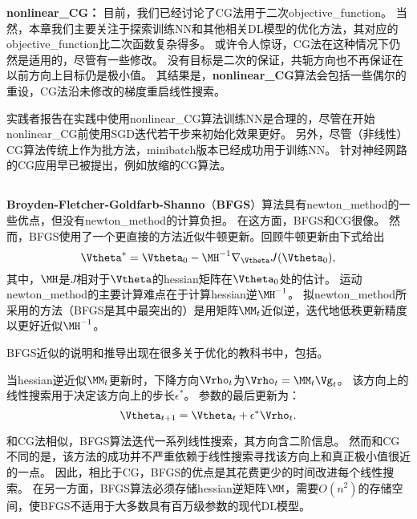 \textbf{\gls{nonlinear_CG}：}
目前，我们已经讨论了\gls{CG}法用于二次\gls{objective_function}。
当然，本章我们主要关注于探索训练\gls{NN}和其他相关\gls{DL}模型的优化方法，其对应的\gls{objective_function}比二次函数复杂得多。
或许令人惊讶，\gls{CG}法在这种情况下仍然是适用的，尽管有一些修改。
没有目标是二次的保证，共轭方向也不再保证在以前方向上目标仍是极小值。
其结果是，\textbf{\gls{nonlinear_CG}}算法会包括一些偶尔的重设，\gls{CG}法沿未修改的梯度重启线性搜索。


实践者报告在实践中使用\gls{nonlinear_CG}算法训练\gls{NN}是合理的，尽管在开始\gls{nonlinear_CG}前使用\gls{SGD}迭代若干步来初始化效果更好。
另外，尽管（非线性）\gls{CG}算法传统上作为批方法，\gls{minibatch}版本已经成功用于训练\gls{NN}\citep{LeRoux-chapter-2011}。
针对神经网路的\gls{CG}应用早已被提出，例如放缩的\gls{CG}算法\citep{Moller}。

\subsection{}
\label{sec:bfgs}
\textbf{Broyden-Fletcher-Goldfarb-Shanno}（\textbf{\gls{BFGS}}）算法具有\gls{newton_method}的一些优点，但没有\gls{newton_method}的计算负担。
在这方面，\gls{BFGS}和CG很像。
然而，\gls{BFGS}使用了一个更直接的方法近似牛顿更新。回顾牛顿更新由下式给出
\begin{equation}
    \Vtheta^* = \Vtheta_0 - \MH^{-1} \nabla_{\Vtheta} J(\Vtheta_0),
\end{equation}
其中，$\MH$是$J$相对于$\Vtheta$的\gls{hessian}矩阵在$\Vtheta_0$处的估计。
运动\gls{newton_method}的主要计算难点在于计算\gls{hessian}逆$\MH^{-1}$。
拟\gls{newton_method}所采用的方法（\gls{BFGS}是其中最突出的）是用矩阵$\MM_t$近似逆，迭代地低秩更新精度以更好近似$\MH^{-1}$。


\gls{BFGS}近似的说明和推导出现在很多关于优化的教科书中，包括\cite{Lue84}。

当\gls{hessian}逆近似$\MM_t$更新时，下降方向$\Vrho_t$为$\Vrho_t = \MM_t \Vg_t$。
该方向上的线性搜索用于决定该方向上的步长$\epsilon^*$。
参数的最后更新为：
\begin{equation}
    \Vtheta_{t+1} = \Vtheta_t + \epsilon^* \Vrho_t.
\end{equation}

和\gls{CG}法相似，\gls{BFGS}算法迭代一系列线性搜索，其方向含二阶信息。
然而和\gls{CG}不同的是，该方法的成功并不严重依赖于线性搜索寻找该方向上和真正极小值很近的一点。
因此，相比于\gls{CG}，\gls{BFGS}的优点是其花费更少的时间改进每个线性搜索。
在另一方面，\gls{BFGS}算法必须存储\gls{hessian}逆矩阵$\MM$，需要$O(n^2)$的存储空间，使\gls{BFGS}不适用于大多数具有百万级参数的现代\gls{DL}模型。

